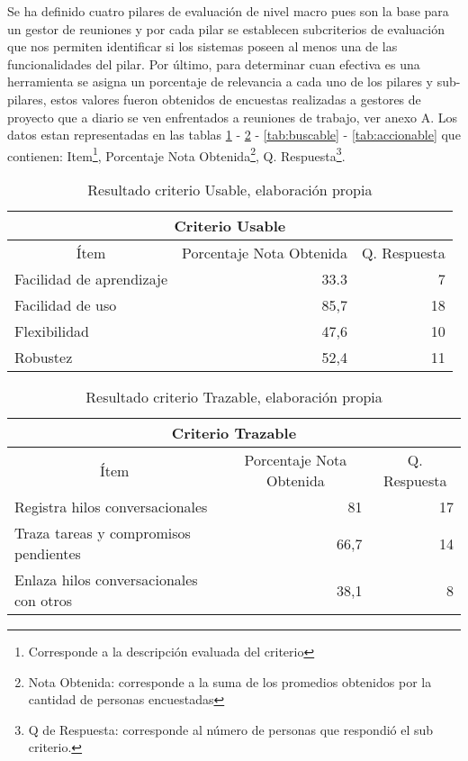 Se ha definido cuatro pilares de evaluación de nivel macro pues son la base para un gestor de reuniones y por cada pilar se establecen subcriterios de evaluación que nos permiten identificar si los sistemas poseen al menos una de las funcionalidades del pilar. Por último, para determinar cuan efectiva es una herramienta se asigna un porcentaje de relevancia a cada uno de los pilares y sub-pilares, estos valores fueron obtenidos de encuestas realizadas a gestores de proyecto que a diario se ven enfrentados a reuniones de trabajo, ver anexo A.  Los datos estan representadas en las tablas \ref{tab:usable} - \ref{tab:trazable} - \ref{tab:buscable} - \ref{tab:accionable} que contienen: Item\footnote{Corresponde a la descripción evaluada del criterio}, Porcentaje Nota Obtenida\footnote{Nota Obtenida: corresponde a la suma de los promedios obtenidos por la cantidad de personas encuestadas}, Q. Respuesta\footnote{Q de Respuesta: corresponde al número de personas que respondió el sub criterio.}.

\begin{table}[!h]
\centering
\caption{Resultado criterio Usable, elaboración propia}
\label{tab:usable}
\begin{tabular}{|l|r|r|}
\hline
\multicolumn{3}{|c|}{Criterio Usable} \\ \hline
\multicolumn{1}{|c|}{Ítem} & \multicolumn{1}{c|}{Porcentaje Nota Obtenida} & \multicolumn{1}{c|}{Q. Respuesta} \\ \hline
Facilidad de aprendizaje & 33.3 & 7 \\ \hline
Facilidad de uso & 85,7 & 18 \\ \hline
Flexibilidad & 47,6 & 10 \\ \hline
Robustez & 52,4 & 11 \\ \hline
\end{tabular}
\end{table}

\begin{table}[!h]
\centering
\caption{Resultado criterio Trazable, elaboración propia}
\label{tab:trazable}
\begin{tabular}{|l|r|r|}
\hline
\multicolumn{3}{|c|}{Criterio Trazable} \\ \hline
\multicolumn{1}{|c|}{Ítem} & \multicolumn{1}{c|}{Porcentaje Nota Obtenida} & \multicolumn{1}{c|}{Q. Respuesta} \\ \hline
Registra hilos conversacionales & 81 & 17 \\ \hline
Traza tareas y compromisos pendientes & 66,7 & 14 \\ \hline
Enlaza hilos conversacionales con otros & 38,1 & 8 \\ \hline
\end{tabular}
\end{table}

